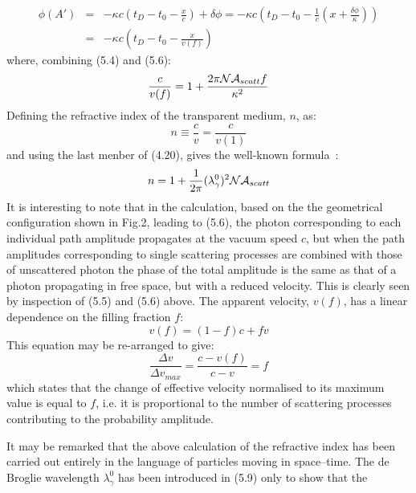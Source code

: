 {   \begin{eqnarray}
 \phi(A') & = & - \kappa c\left(t_D-t_0- \frac{x}{c} \right) + \delta \phi
   =  - \kappa c\left(t_D-t_0 - \frac{1}{c}(x+\frac{ \delta \phi}{\kappa}) \right) 
  \nonumber \\
   & = & - \kappa c\left(t_D-t_0-\frac{x}{v(f)} \right)
 \end{eqnarray}
   where, combining (5.4) and (5.6):
   \begin{equation}
  \frac{c }{v(f)} = 1+  \frac{2 \pi {\cal N} {\cal A}_{scatt} f }{ \kappa^2}
 \end{equation}
   Defining the refractive index of the transparent
    medium, $n$, as:
     \begin{equation}
    n \equiv \frac{c}{v} = \frac{c}{v(1)}   
 \end{equation}
   and using the last menber of (4.20), gives the well-known formula~\cite{Sakurai}:
      \begin{equation}
    n  = 1 + \frac{1}{2 \pi} (\lambda_{\gamma}^0)^2 {\cal N} {\cal A}_{scatt}   
 \end{equation} 
   It is interesting to note that in the calculation, based on the the geometrical
  configuration shown in Fig.2, leading to (5.6), the photon corresponding to each 
  individual path amplitude propagates at the vacuum speed $c$, but when the path amplitudes 
   corresponding to single scattering processes  are combined with those of unscattered 
  photon the phase of the total amplitude is the same as that of a photon
  propagating in free space, but with a reduced velocity. This is clearly seen by inspection
  of (5.5) and (5.6) above.
 The apparent velocity, $v(f)$, has a linear dependence
 on the filling fraction $f$:
     \begin{equation}
 v(f) = (1-f)c+fv
 \end{equation}
This equation may be re-arranged to give:
     \begin{equation}
  \frac{\Delta v}{\Delta v_{max}} = \frac{c- v(f)}{c- v} = f
\end{equation}
 which states that the change of effective velocity normalised 
to its maximum value is  equal to $f$, i.e. it is proportional to the number of
 scattering processes contributing to the probability amplitude.
 \par It may be remarked that the above calculation of the refractive index has been
 carried out entirely in the language of particles moving in space--time. The de Broglie
 wavelength  $\lambda_{\gamma}^0$ has been introduced in (5.9) only to show that the
}

